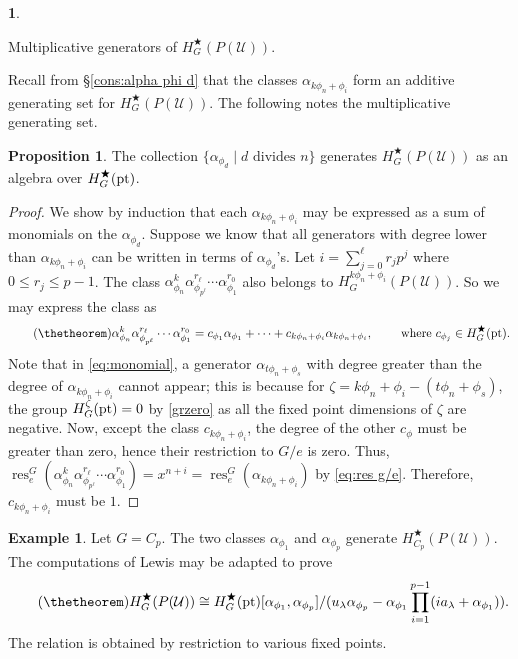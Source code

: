 \documentclass[a4paper,leqno,11pt]{amsart}
\theoremstyle{plain}
\theoremstyle{definition}
\newtheorem{prop}[theorem]{Proposition}
\newtheorem{exam}[theorem]{Example}
\newtheorem{subsec}[theorem]{}
\theoremstyle{remark}
\theoremstyle{definition}
\newenvironment{myeq}[1][]
{\stepcounter{theorem}\begin{equation}\tag{\thetheorem}{#1}}
	{\end{equation}}
\newenvironment{mysubsection}[2][]
{\begin{subsec}\begin{upshape}\begin{bfseries}{#2.}
			\end{bfseries}{#1}}
		{\end{upshape}\end{subsec}}
\newcommand{\res}{\mathit{res}}
\def\sU{\mathcal{U}}
\numberwithin{equation}{section}
\newcommand{\pt}{\textup{pt}}
\renewcommand{\res}{\operatorname{res}}
\begin{document}
\begin{mysubsection}{Multiplicative generators of $H^{\bigstar}_{G}(P(\mathcal{U}))$}
		Recall	from \S \ref{cons:alpha phi d} that the classes $ \alpha_{k\phi_n+\phi_i} $ form an additive generating set for $H^{\bigstar}_{G}(P(\mathcal{U}))$. The following notes the multiplicative generating set.
		\begin{prop}\label{prop:multi gene}
			The collection   $\{\alpha_{{\phi_d} }\mid d \mbox{ divides }n\}$  generates $H^{\bigstar}_{G}(P(\mathcal{U}))$ as an algebra over $H^{\bigstar}_{G}(\pt)$.
		\end{prop}
		\begin{proof}
			We show by induction that each $\alpha_{k\phi_n+\phi_i}  $ may be expressed as a sum of monomials on the $ \alpha_{\phi_d} $. Suppose we know that all generators with degree lower than  $ \alpha_{k\phi_n+\phi_i} $ can be written in terms of $  \alpha_{{\phi_d} }$'s.
			Let $ i=\sum_{j=0}^\ell r_jp^j $ where $ 0\le r_j\le p-1 $. The class $ \alpha_{\phi_n}^k  \alpha_{\phi_{p^\ell}}^{r_\ell}\cdots \alpha_{\phi_1}^{r_0} $ also belongs to $ H^{k\phi_n+\phi_i}_{G}(P(\sU)) $.
			So we may express the class as
			\begin{myeq}\label{eq:monomial}
				\alpha_{\phi_n}^k  \alpha_{\phi_{p^\ell}}^{r_\ell}\cdots \alpha_{\phi_1}^{r_0} =	c_{\phi_1}\alpha_{\phi_1}+\cdots +c_{k\phi_n+\phi_i}  \alpha_{k\phi_n+\phi_i}, \qquad \textup{~where~} c_{\phi_j}\in H^{\bigstar}_{G}(\pt). 
			\end{myeq}
			Note that in \eqref{eq:monomial},  a generator  $ \alpha_{t\phi_n+\phi_s} $ with degree  greater than the degree of $ \alpha_{k\phi_n+\phi_i} $ cannot appear; this is because  for  $ \zeta=k\phi_n+\phi_i-(t\phi_n+\phi_s) $, the group $  H^{\zeta}_{G}(\pt) =0$ by \eqref{grzero} as all the fixed point dimensions of $ \zeta  $ are negative. Now, except the class $ c_{k\phi_n+\phi_i} $, the degree of the other $ c_\phi $  must be greater than zero, hence their restriction to $ G/e $ is zero. Thus,  $ \res^G_e(\alpha_{\phi_n}^k  \alpha_{\phi_{p^\ell}}^{r_\ell}\cdots \alpha_{\phi_1}^{r_0})=x^{n+i} =\res^G_e(\alpha_{k\phi_n+\phi_i})$  by \eqref{eq:res g/e}. Therefore, $ c_{k\phi_n+\phi_i} $ must be $ 1 $.
		\end{proof}
		\begin{exam}
			Let $ G=C_p $. 	The two classes $ \alpha_{\phi_1}$ and $ \alpha_{\phi_p} $  generate  $H^{\bigstar}_{C_p}(P(\mathcal{U})) $.  The computations of Lewis \cite[\S 5]{Lewis} may be adapted to prove
			\begin{myeq}\label{eq:cp case ring str}
				H^{\bigstar}_{G}(P(\mathcal{U}))\cong H^{\bigstar}_{G}(\pt)[\alpha_{\phi_1}, \alpha_{\phi_p}]/(u_\lambda\alpha_{\phi_p}-\alpha_{\phi_1}\prod_{i=1}^{p-1}(ia_\lambda+\alpha_{\phi_1})).
			\end{myeq}
			The relation is obtained by restriction to various fixed points.
		\end{exam}
		\medskip
		

\end{mysubsection}
\end{document}
